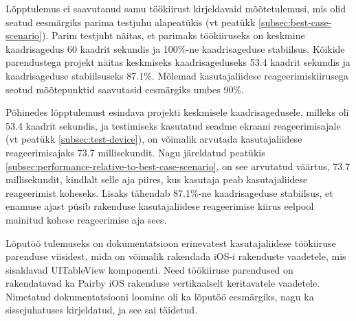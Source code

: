 \documentclass[a4paper,12pt]{article}
\begin{document}
Lõpptulemus ei saavutanud samu töökiirust kirjeldavaid mõõtetulemusi, mis olid seatud eesmärgiks parima testjuhu alapeatükis (vt peatükk \ref{subsec:best-case-scenario}). Parim testjuht näitas, et parimaks töökiiruseks on keskmine kaadrisagedus 60 kaadrit sekundis ja 100\%-ne kaadrisageduse stabiilsus. Kõikide parendustega projekt näitas keskmiseks kaadrisageduseks 53.4 kaadrit sekundis ja kaadrisageduse stabiilsuseks 87.1\%. Mõlemad kasutajaliidese reageerimiskiirusega seotud mõõtepunktid saavutasid eesmärgiks umbes 90\%.

Põhinedes lõpptulemust esindava projekti keskmisele kaadrisagedusele, milleks oli 53.4 kaadrit sekundis, ja testimiseks kasutatud seadme ekraani reageerimisajale (vt peatükk \ref{subsec:test-device}), on võimalik arvutada kasutajaliidese reageerimisajaks 73.7 millisekundit. Nagu järeldatud peatükis \ref{subsec:performance-relative-to-best-case-scenario}, on see arvutatud väärtus, 73.7 millisekundit, kindlalt selle aja piires, kus kasutaja peab kasutajaliidese reageerimist koheseks. Lisaks tähendab 87.1\%-ne kaadrisageduse stabiilsus, et enamuse ajast püsib rakenduse kasutajaliidese reageerimise kiirus eelpool mainitud kohese reageerimise aja sees.

Lõputöö tulemuseks on dokumentatsioon erinevatest kasutajaliidese töökiiruse parenduse viisidest, mida on võimalik rakendada iOS-i rakenduste vaadetele, mis sisaldavad UITableView komponenti. Need töökiiruse parendused on rakendatavad ka Pairby iOS rakenduse vertikaalselt keritavatele vaadetele. Nimetatud dokumentatsiooni loomine oli ka lõputöö eesmärgiks, nagu ka sissejuhatuses kirjeldatud, ja see sai täidetud.


\newpage
{}
{}
\listoffigures

\newpage
{}
{}


\end{document}

